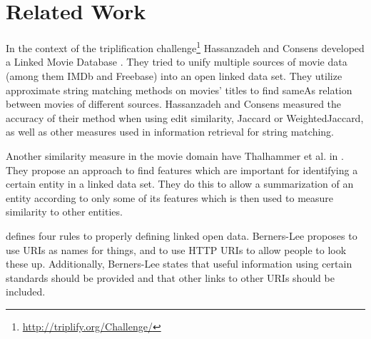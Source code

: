 \section{Related Work}
\label{sec_related_work}


In the context of the triplification challenge\footnote{\url{http://triplify.org/Challenge/}} Hassanzadeh and Consens developed a Linked Movie Database \cite{LMDB}.
They tried to unify multiple sources of movie data (among them IMDb and Freebase) into an open linked data set.
They utilize approximate string matching methods on movies' titles to find sameAs relation between movies of different sources.
Hassanzadeh and Consens measured the accuracy of their method when using edit similarity, Jaccard or WeightedJaccard, as well as other measures used in information retrieval for string matching.

Another similarity measure in the movie domain have Thalhammer et al. in \cite{MovieSummarization}.
They propose an approach to find features which are important for identifying a certain entity in a linked data set.
They do this to allow a summarization of an entity according to only some of its features which is then used to measure similarity to other entities.

\cite{linkedData_DesignIssues} defines four rules to properly defining linked open data.
Berners-Lee proposes to use URIs as names for things, and to use HTTP URIs to allow people to look these up.
Additionally, Berners-Lee states that useful information using certain standards should be provided and that other links to other URIs should be included.











